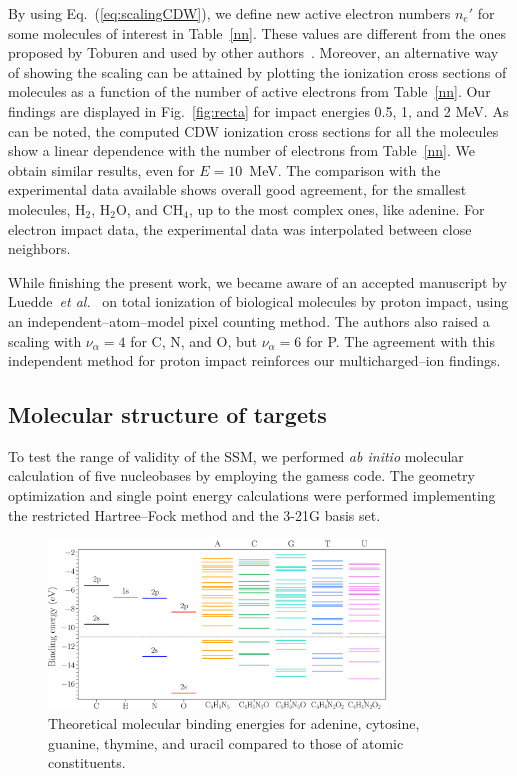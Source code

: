 \documentclass[10pt,showpacs,twocolumn]{revtex4}
\begin{document}
By using Eq.~(\ref{eq:scalingCDW}), we define new active electron 
numbers $n_e'$ for some molecules of interest in Table~\ref{nn}. These 
values are different from the ones proposed by Toburen and used by 
other authors~\cite{itoh2013}. Moreover, an alternative way of showing 
the scaling can be attained by plotting the ionization cross sections 
of molecules as a function of the number of active electrons from 
Table~\ref{nn}. Our findings are displayed in Fig.~\ref{fig:recta} for 
impact energies 0.5, 1, and 2 MeV. As can be noted, the computed CDW 
ionization cross sections for all the molecules show a linear 
dependence with the number of electrons from Table~\ref{nn}. We obtain 
similar results, even for $E=10$~MeV. The comparison with the 
experimental data available shows overall good agreement, for the 
smallest molecules, H$_2$, H$_2$O, and CH$_4$, up to the most complex 
ones, like adenine. For electron impact data, the experimental data was 
interpolated between close neighbors.

While finishing the present work, we became aware of an accepted manuscript by 
Luedde~{\it et al.}~\cite{luedde2019} on total ionization of biological
molecules by proton impact, using an independent--atom--model pixel counting
method. The authors also raised a scaling with $\nu_{\alpha}=4$ 
for C, N, and O, but $\nu_{\alpha}=6$ for P. The agreement with this 
independent method for proton impact reinforces our multicharged--ion findings.

\subsection{Molecular structure of targets}
\label{subsec:molcalculations}

To test the range of validity of the SSM, we performed {\it ab initio}
molecular calculation of five nucleobases by employing the {\sc gamess} 
code. The geometry optimization and single point energy calculations 
were performed implementing the restricted Hartree--Fock method and the 
3-21G basis set. 

\begin{figure}[t]
\centering
\includegraphics[width=0.8\textwidth]{figuras/levelsDNA.eps}
\caption{Theoretical molecular binding energies for adenine, cytosine, 
guanine, thymine, and uracil compared to those of atomic constituents.}
\label{fig:bindener}
\end{figure}
\end{document}
